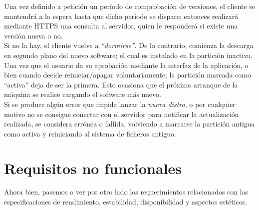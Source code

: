 Una vez definido a petición un período de comprobación de versiones, el cliente se mantendrá a la espera hasta que dicho período se dispare; entonces realizará mediante HTTPS una consulta al servidor, quien le responderá si existe una versión nueva o no.\\

Si no la hay, el cliente vuelve a \textit{``dormirse''}. De lo contrario, comienza la descarga en segundo plano del nuevo software; el cual es instalado en la partición inactiva.\\

Una vez que el usuario da su aprobación mediante la interfaz de la aplicación, o bien cuando decide reiniciar/apagar voluntariamente; la partición marcada como ``activa'' deja de ser la primera. Esto ocasiona que el próximo arranque de la máquina se realice cargando el software más nuevo.\\

Si se produce algún error que impide lanzar la \textit{nueva distro}, o por cualquier motivo no se consigue conectar con el servidor para notificar la actualización realizada, se considera errónea o fallida, volviendo a marcarse la partición antigua como activa y reiniciando al sistema de ficheros antiguo.

\section{Requisitos no funcionales}

Ahora bien, pasemos a ver por otro lado los requerimientos relacionados con las especificaciones de rendimiento, estabilidad, disponibilidad y aspectos estéticos.

